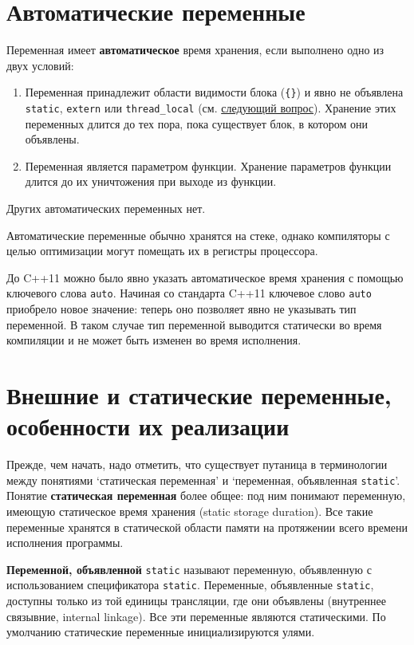 \documentclass[14pt, a4paper]{extarticle}
\begin{document}
\section{Автоматические переменные}
Переменная имеет \textbf{автоматическое} время хранения, если выполнено одно из двух условий:
\label{def:auto_storage}
\begin{enumerate}
  \item Переменная принадлежит области видимости блока (\verb|{}|) и явно не объявлена \verb|static|, \verb|extern| или \verb|thread_local|
  (см. \hyperref[sec:ext_stat]{следующий вопрос}).
  Хранение этих переменных длится до тех пора, пока существует блок, в котором они объявлены.
  \item Переменная является параметром функции. Хранение параметров функции длится до их уничтожения при выходе из функции.
\end{enumerate}
Других автоматических переменных нет.

Автоматические переменные обычно хранятся на стеке, однако компиляторы с целью
оптимизации могут помещать их в регистры процессора.

До C++11 можно было явно указать автоматическое время хранения с помощью
ключевого слова \verb|auto|. Начиная со стандарта C++11 ключевое слово
\verb|auto| приобрело новое значение: теперь оно позволяет явно не указывать
тип переменной. В таком случае тип переменной выводится статически во время
компиляции и не может быть изменен во время исполнения.

\section{Внешние и статические переменные, особенности их реализации}
\label{sec:ext_stat}
Прежде, чем начать, надо отметить, что существует путаница в терминологии
между понятиями `статическая переменная' и `переменная, объявленная \verb|static|'.
Понятие \textbf{статическая переменная} более общее: под ним понимают переменную,
имеющую статическое время хранения (static storage duration). Все такие переменные
хранятся в статической области памяти на протяжении всего времени исполнения программы.

\textbf{Переменной, объявленной} \verb|static| называют переменную, объявленную с использованием
спецификатора \verb|static|. Переменные, объявленные \verb|static|, доступны только
из той единицы трансляции, где они объявлены (внутреннее связывние, internal linkage).
Все эти переменные являются статическими. По умолчанию статические переменные инициализируются
улями.
\end{document}
